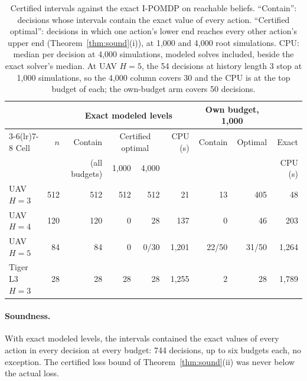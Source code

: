 \documentclass{article}
\begin{document}
\begin{table}[h]
\centering
\small
\begin{tabular}{@{}lrrrrrrrr@{}}
\toprule
& & \multicolumn{4}{c}{Exact modeled levels} & \multicolumn{2}{c}{Own budget, 1{,}000} & \\
\cmidrule(lr){3-6}\cmidrule(lr){7-8}
Cell & $n$ & Contain & \multicolumn{2}{c}{Certified optimal} & CPU (s) & Contain & Optimal & Exact \\
& & (all budgets) & 1{,}000 & 4{,}000 & & & & CPU (s) \\
\midrule
UAV $H = 3$ & 512 & 512 & 512 & 512 & 21 & 13 & 405 & 48 \\
UAV $H = 4$ & 120 & 120 & 0 & 28 & 137 & 0 & 46 & 203 \\
UAV $H = 5$ & 84 & 84 & 0 & 0/30 & 1{,}201 & 22/50 & 31/50 & 1{,}264 \\
Tiger L3 $H = 3$ & 28 & 28 & 28 & 28 & 1{,}255 & 2 & 28 & 1{,}789 \\
\bottomrule
\end{tabular}
\caption{Certified intervals against the exact I-POMDP on reachable beliefs. ``Contain'': decisions whose intervals contain the exact value of every action. ``Certified optimal'': decisions in which one action's lower end reaches every other action's upper end (Theorem~\ref{thm:sound}(i)), at 1{,}000 and 4{,}000 root simulations. CPU: median per decision at 4{,}000 simulations, modeled solves included, beside the exact solver's median. At UAV $H = 5$, the 54 decisions at history length 3 stop at 1{,}000 simulations, so the 4{,}000 column covers 30 and the CPU is at the top budget of each; the own-budget arm covers 50 decisions.}
\label{tab:coverage}
\end{table}

\paragraph{Soundness.} With exact modeled levels, the intervals contained the exact values of every action in every decision at every budget: 744 decisions, up to six budgets each, no exception. The certified loss bound of Theorem~\ref{thm:sound}(ii) was never below the actual loss.
\end{document}
